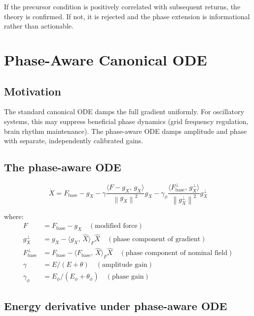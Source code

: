 \documentclass[11pt,a4paper]{article}
\theoremstyle{definition}
\newcommand{\norm}[1]{\left\|#1\right\|}
\newcommand{\inner}[2]{\langle #1,\,#2\rangle}
\newcommand{\Fbase}{F_{\mathrm{base}}}
\newcommand{\gX}{g_X}
\begin{document}
If the precursor condition is positively correlated with subsequent returns, the theory is confirmed.
If not, it is rejected and the phase extension is informational rather than actionable.

\section{Phase-Aware Canonical ODE}

\subsection{Motivation}

The standard canonical ODE damps the full gradient uniformly.
For oscillatory systems, this may suppress beneficial phase dynamics
(grid frequency regulation, brain rhythm maintenance).
The phase-aware ODE damps amplitude and phase with separate, independently calibrated gains.

\subsection{The phase-aware ODE}

\begin{lockedbox}
\[
\dot X = \Fbase - \gX - \gamma\frac{\inner{F - \gX}{\gX}}{\norm{\gX}^2}\gX
- \gamma_\phi\frac{\inner{\Fbase^\perp}{\gX^\perp}}{\norm{\gX^\perp}^2}\gX^\perp
\]
\end{lockedbox}

where:
\begin{align*}
F &= \Fbase - \gX \quad(\text{modified force})\\
\gX^\perp &= \gX - \inner{\gX}{\hat X}_F\hat X \quad(\text{phase component of gradient})\\
\Fbase^\perp &= \Fbase - \inner{\Fbase}{\hat X}_F\hat X \quad(\text{phase component of nominal field})\\
\gamma &= E/(E+\theta) \quad(\text{amplitude gain})\\
\gamma_\phi &= E_\phi/(E_\phi + \theta_\phi) \quad(\text{phase gain})
\end{align*}

\subsection{Energy derivative under phase-aware ODE}
\end{document}
